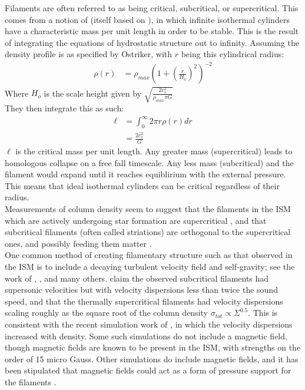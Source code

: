 \documentclass[a4paper,12pt]{article}
\begin{document}
Filaments are often referred to as being critical, subcritical, or supercritical. This comes from a notion of \cite{im92} (itself based on \cite{ost64}), in which infinite isothermal cylinders have a characteristic mass per unit length in order to be stable. This is the result of integrating the equations of hydrostatic structure out to infinity. Assuming the density profile is as specified by Ostriker, with $r$ being this cylindrical radius:
\begin{align*}
\rho(r) &= \rho_{max} \left(1 + \left(\frac{r}{H_o}\right)^2\right)^{-2}
\end{align*} Where $H_o$ is the scale height given by $\sqrt{\frac{2c_s^2}{\rho_{max} \pi G}}$\\
They then integrate this as such:
\begin{align*}
\ell&= \int_0^\infty 2\pi r \rho(r) dr\\
	&= \frac{2c_s^2}{G}
\end{align*} $\ell$ is the critical mass per unit length. Any greater mass (supercritical) leads to homologous collapse on a free fall timescale. Any less mass (subcritical) and the filament would expand until it reaches equiblirium with the external pressure. This means that ideal isothermal cylinders can be critical regardless of their radius.\\

Measurements of column density seem to suggest that the filaments in the ISM which are actively undergoing star formation are supercritical \citep{pal13}, and that subcritical filaments (often called striations) are orthogonal to the supercritical ones, and possibly feeding them matter \citep{per12}.\\

One common method of creating filamentary structure such as that observed in the ISM is to include a decaying turbulent velocity field and self-gravity; see the work of \citep{bwc01}, \citep{go11}, \citep{mcm15} and many others. \cite{arz13} claim the observed subcritical filaments had supersonic velocities but with velocity dispersions less than twice the sound speed, and that the thermally supercritical filaments had velocity dispersions scaling roughly as the square root of the column density $\sigma_{tot} \propto \Sigma^{0.5}$. This is consistent with the recent simulation work of \cite{mcm15}, in which the velocity dispersions increased with density. Some such simulations do not include a magnetic field, though magnetic fields are known to be present in the ISM, with strengths on the order of 15 micro Gauss. Other simulations do include magnetic fields, and it has been stipulated that magnetic fields could act as a form of pressure support for the filaments \citep{lar85} \citep{pal13}.\\
\end{document}
